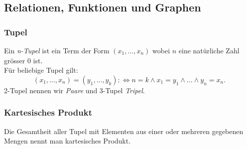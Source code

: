 \subsection{Relationen, Funktionen und Graphen}%
\label{sub:Relatiinen, Funktionen und Graphen}

\subsubsection{Tupel}%
\label{ssub:tupel}
Ein \textit{n-Tupel} ist ein Term der Form $(x_1,...,x_n)$ wobei $n$ eine natürliche Zahl grösser $0$ ist. \\
Für beliebige Tupel gilt:
\begin{equation}
	(x_1,\dots,x_n)=(y_1,\dots,y_k):\Leftrightarrow n=k\land x_1=y_1\land\dots\land y_n=x_n.
\end{equation}
2-Tupel nennen wir \textit{Paare} und 3-Tupel \textit{Tripel}.

\subsubsection{Kartesisches Produkt}%
\label{ssub:kartesisches_produkt}

Die Gesamtheit aller Tupel mit Elementen aus einer oder mehreren gegebenen Mengen nennt man kartesisches Produkt.


